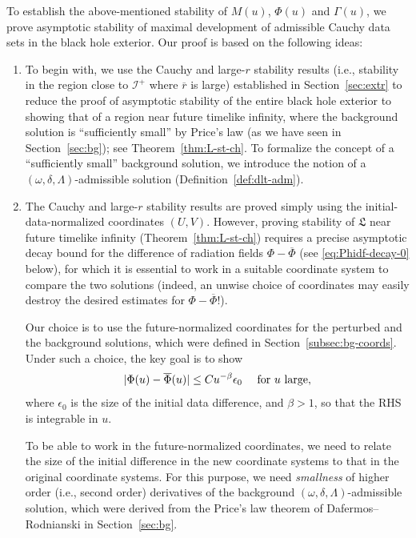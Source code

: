 \documentclass[10pt, reqno]{amsart}
\theoremstyle{definition}
\theoremstyle{remark}
\theoremstyle{conjecture}
\numberwithin{equation}{section}
\newcommand{\abs}[1]{\vert#1\vert}
\newcommand{\0}{\emptyset}
\newcommand{\bt}{\beta}
\newcommand{\Gmm}{\Gamma}
\newcommand{\dlt}{\delta}
\newcommand{\eps}{\epsilon}
\newcommand{\Lmb}{\Lambda}
\newcommand{\omg}{\omega}
\newcommand{\calI}{\mathcal I}
\newcommand{\NI}{\calI^{+}}						%
\newcommand{\rbg}{\overline{r}}					%
\newcommand{\Phibg}{\overline{\Phi}}				%
\begin{document}
To establish the above-mentioned stability of $M(u)$, $\Phi(u)$ and $\Gmm(u)$, we prove asymptotic stability of maximal development of admissible Cauchy data sets in the black hole exterior. Our proof is based on the following ideas:
\begin{enumerate} 
\item To begin with, we use the Cauchy and large-$r$ stability results (i.e., stability in the region close to $\NI$ where $\rbg$ is large) established in Section~\ref{sec:extr} to reduce the proof of asymptotic stability of the entire black hole exterior to showing that of a region near future timelike infinity, where the background solution is ``sufficiently small'' by Price's law (as we have seen in Section~\ref{sec:bg}); see Theorem~\ref{thm:L-st-ch}. To formalize the concept of a ``sufficiently small'' background solution, we introduce the notion of a $(\omg, \dlt, \Lmb)$-admissible solution (Definition~\ref{def:dlt-adm}). 

\item The Cauchy and large-$r$ stability results are proved simply using the initial-data-normalized coordinates $(U, V)$. However, proving stability of $\mathfrak{L}$ near future timelike infinity (Theorem~\ref{thm:L-st-ch}) requires a precise asymptotic decay bound for the difference of radiation fields $\Phi - \overline{\Phi}$ (see \eqref{eq:Phidf-decay-0} below), for which it is essential to work in a suitable coordinate system to compare the two solutions (indeed, an unwise choice of coordinates may easily destroy the desired estimates for $\Phi - \overline{\Phi}$!). 

Our choice is to use the future-normalized coordinates for the perturbed and the background solutions, which were defined in Section~\ref{subsec:bg-coords}. Under such a choice, the key goal is to show
\begin{equation} \label{eq:Phidf-decay-0}
	\abs{\Phi(u) - \Phibg(u)} \leq C u^{-\bt} \eps_{0}		\quad \hbox{ for $u$ large}, 
\end{equation}
where $\eps_{0}$ is the size of the initial data difference, and $\bt > 1$, so that the RHS is integrable in $u$. 

To be able to work in the future-normalized coordinates, we need to relate the size of the initial difference in the new coordinate systems to that in the original coordinate systems. For this purpose, we need \emph{smallness} of higher order (i.e., second order) derivatives of the background $(\omg, \dlt, \Lmb)$-admissible solution, which were derived from the Price's law theorem of Dafermos--Rodnianski in Section~\ref{sec:bg}. 


\end{enumerate}
\end{document}
